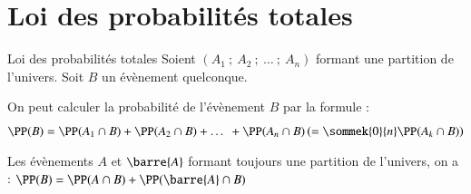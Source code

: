 \documentclass[oneside,12pt]{article}          %
\begin{document}
\section{Loi des probabilités totales}

\begin{theoreme}{Loi des probabilités totales}
	Soient $(A_1~;~A_2~;~\ldots~;~A_n)$ formant une partition de l'univers. Soit $B$ un évènement quelconque.
	
	On peut calculer la probabilité de l'évènement $B$ par la formule : \\
	\phantom{}\hspace{25mm} $ \PP(B) = \PP(A_1 \cap B) + \PP(A_2 \cap B) + \ldots + \PP(A_n \cap B) \left( = \sommek{0}{n} \PP(A_k \cap B)\right) $
\end{theoreme}



\begin{remarque}
	Les évènements $A$ et $\barre{A}$ formant toujours une partition de l'univers, on a : $\PP(B)=\PP(A \cap B) + \PP(\barre{A} \cap B)$
\end{remarque}
\end{document}
